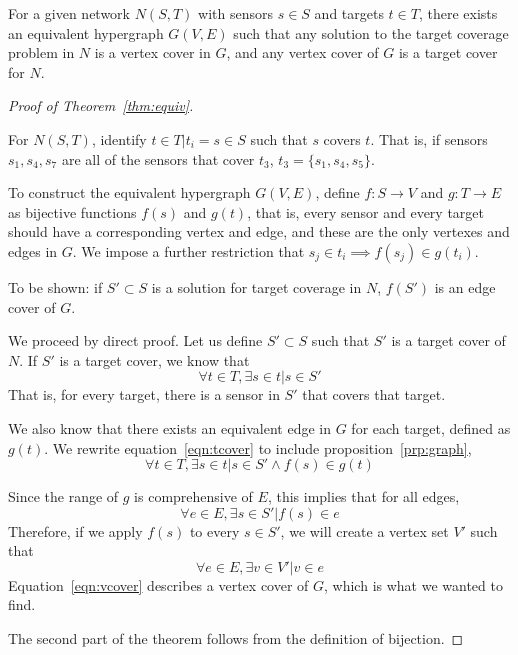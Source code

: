 \begin{thm}
  For a given network $N(S,T)$ with sensors $s\in S$ and targets $t\in T$, there exists an equivalent hypergraph $G(V,E)$ such that any solution to the target coverage problem in $N$ is a vertex cover in $G$, and any vertex cover of $G$ is a target cover for $N$.
\label{thm:equiv}
\end{thm}
\begin{proof}[Proof of Theorem~\ref{thm:equiv}]
\begin{prop}
For $N(S,T)$, identify $t \in T | t_i = s \in S $ such that $s$ covers $t$. That is, if sensors $s_1, s_4, s_7$ are all of the sensors that cover $t_3$, $t_3 = \{s_1, s_4, s_5\}$. \label{prp:network}
\end{prop}
\begin{prop}To construct the equivalent hypergraph $G(V,E)$, define $f:S\to V$ and $g:T\to E$ as bijective functions $f(s)$ and $g(t)$, that is, every sensor and every target should have a corresponding vertex and edge, and these are the only vertexes and edges in $G$. We impose a further restriction that $ s_j \in t_i \implies f(s_j) \in g(t_i)$. 
\label{prp:graph}
\end{prop}

To be shown: if $S' \subset S$ is a solution for target coverage in $N$, $f(S')$ is an edge cover of $G$. 

We proceed by direct proof. Let us define $S'\subset S$ such that $S'$ is a target cover of $N$. If $S'$ is a target cover, we know that 
\begin{equation}
\forall t \in T, \exists s \in t | s \in S'
\label{eqn:tcover}
\end{equation}
That is, for every target, there is a sensor in $S'$ that covers that target.

We also know that there exists an equivalent edge in $G$ for each target, defined as $g(t)$. We rewrite equation~\ref{eqn:tcover} to include proposition~\ref{prp:graph},
\begin{equation}
\forall t \in T, \exists s \in t | s \in S' \land f(s) \in g(t)
\label{eqn:extcover}
\end{equation}

Since the range of $g$ is comprehensive of $E$, this implies that for all edges,
\begin{equation}
\forall e \in E, \exists s \in S' | f(s) \in e
\end{equation}
Therefore, if we apply $f(s)$ to every $s \in S'$, we will create a vertex set $V'$ such that
\begin{equation}
\forall e \in E, \exists v \in V' | v \in e
\label{eqn:vcover}
\end{equation}
Equation~\ref{eqn:vcover} describes a vertex cover of $G$, which is what we wanted to find.

The second part of the theorem follows from the definition of bijection. 
\end{proof}

